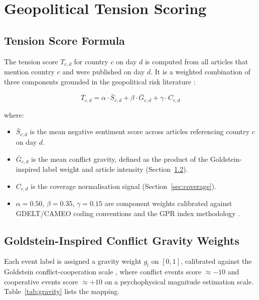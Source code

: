 \documentclass[12pt,a4paper]{report}
\begin{document}
\section{Geopolitical Tension Scoring}
\label{sec:scoring}

\subsection{Tension Score Formula}

The tension score $T_{c,d}$ for country $c$ on day $d$ is computed from all
articles that mention country $c$ and were published on day $d$. It is a
weighted combination of three components grounded in the geopolitical risk
literature \cite{caldara2022, manela2017}:

\begin{equation}
  T_{c,d} = \alpha \cdot \bar{S}_{c,d}
           + \beta  \cdot \bar{G}_{c,d}
           + \gamma \cdot C_{c,d}
  \label{eq:tension}
\end{equation}

\noindent where:
\begin{itemize}
  \item $\bar{S}_{c,d}$ is the mean negative sentiment score across
        articles referencing country $c$ on day $d$.
  \item $\bar{G}_{c,d}$ is the mean conflict gravity, defined as the
        product of the Goldstein-inspired label weight and article intensity
        (Section~\ref{sec:gravity}).
  \item $C_{c,d}$ is the coverage normalisation signal
        (Section~\ref{sec:coverage}).
  \item $\alpha = 0.50$, $\beta = 0.35$, $\gamma = 0.15$ are component
        weights calibrated against GDELT/CAMEO coding conventions
        \cite{leetaru2013, schrodt2012} and the GPR index methodology
        \cite{caldara2022}.
\end{itemize}

\subsection{Goldstein-Inspired Conflict Gravity Weights}
\label{sec:gravity}

Each event label is assigned a gravity weight $g_l$ on $[0, 1]$,
calibrated against the Goldstein conflict-cooperation scale
\cite{goldstein1992}, where conflict events score $\approx -10$ and
cooperative events score $\approx +10$ on a psychophysical magnitude
estimation scale. Table~\ref{tab:gravity} lists the mapping.
\end{document}
